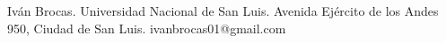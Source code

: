 \begin{contact}
Iván Brocas. Universidad Nacional de San Luis. Avenida Ejército de los Andes 950, Ciudad de San Luis. ivanbrocas01@gmail.com
\end{contact}
